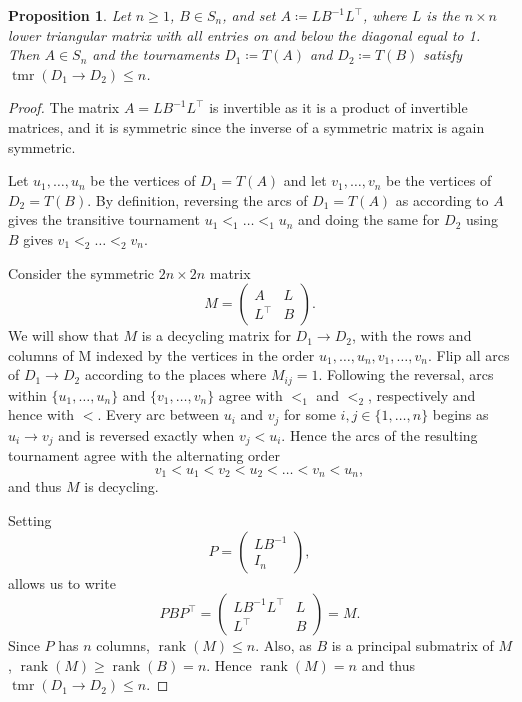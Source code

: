 \documentclass[10pt,a4paper]{amsart}
\numberwithin{equation}{section}
\theoremstyle{plain}
\newtheorem{prop}[thm]{Proposition}
\theoremstyle{remark}
\theoremstyle{definition}
\newcommand{\tmr}{\operatorname{tmr}}
\newcommand{\rank}{\operatorname{rank}}
\begin{document}
\begin{prop} \label{propcon}
    Let $n \geq 1$, $B \in S_n$, and set $A \coloneqq LB^{-1}L^{\top}$, where $L$ is the $n \times n$ lower triangular matrix with all entries on and below the diagonal equal to 1. Then $A \in S_n$ and the tournaments
        $D_1 \coloneqq T(A)$ and $D_2 \coloneqq T(B)$ satisfy $\tmr(D_1 \to D_2) \le n$.    
\end{prop}
\begin{proof}
    The matrix $A =  LB^{-1}L^{\top}$ is invertible as it is a product of invertible matrices, and it is symmetric since the inverse of a symmetric matrix is again symmetric. 

     Let $u_1,\ldots,u_n$ be the vertices of $D_1 = T(A)$ and let  $v_1,\ldots,v_n$ be the vertices of $D_2 = T(B)$. 
      By definition, reversing the arcs of $D_1 = T(A)$ as according to $A$ gives the transitive tournament $u_1 <_1 \dots <_1 u_n$ and doing the same for $D_2$ using $B$ gives $v_1 <_2\dots<_2 v_n$.

    Consider the symmetric $2n \times 2n$ matrix
    \begin{equation*}
        M = \begin{pmatrix}
            A &L\\L^{\top} &B
        \end{pmatrix}.
    \end{equation*}
    We will show that $M$ is a decycling matrix for $D_1 \to D_2$, with the rows and columns of M indexed by the vertices in the order $u_1,\ldots,u_n,v_1,\ldots,v_n$. 
    Flip all arcs of $D_1 \to D_2$ according to the places where $M_{ij} = 1$. Following the reversal, arcs within $\{u_1,\ldots,u_n\}$ and $\{v_1,\ldots,v_n\}$ agree with $<_1$ and $<_2$, respectively and hence with $<$. Every arc between $u_i$ and $v_j$ for some $i,j \in \{1,\ldots, n\}$ begins as $u_i \to v_j$ and is reversed exactly when $v_j < u_i$. 
    Hence the arcs of the resulting tournament agree with the alternating order
    \begin{equation*}
        v_1<u_1<v_2<u_2<\dots<v_n<u_n,
    \end{equation*}
   and thus $M$ is decycling. 

     
     Setting 
     \begin{equation*}
         P = \begin{pmatrix}
             LB^{-1} \\I_n
         \end{pmatrix},
     \end{equation*}
    allows us to write
    \begin{equation*}
      PBP^{\top} = \begin{pmatrix}
          LB^{-1}L^{\top} & L \\ L^{\top} & B
      \end{pmatrix}  = M.
    \end{equation*}
    Since $P$ has $n$ columns, $\rank(M) \le n$. Also, as $B$ is a principal submatrix of $M$, $\rank(M) \geq \rank(B) =n$. Hence $\rank(M) =n$ and thus $\tmr(D_1 \to D_2) \le n$.
\end{proof}
\end{document}
